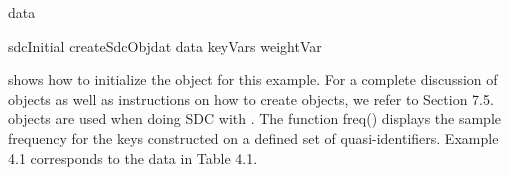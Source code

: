 \documentclass[letterpaper,10pt,english]{sphinxmanual}
\begin{document}
\begin{footnote}[5]
\begin{sphinxVerbatim}[commandchars=\\\{\}]
         
         


data       


sdcInitial  createSdcObjdat  data
keyVars      weightVar  
\end{sphinxVerbatim}
%
\end{footnote}
shows how to initialize the  object for
this example. For a complete discussion of  objects as well as
instructions on how to create  objects, we refer to Section
7.5.  objects are used when doing SDC with . The
function freq() displays the sample frequency for the keys constructed
on a defined set of quasi-identifiers. Example 4.1 corresponds to the
data in Table 4.1.
\end{document}
